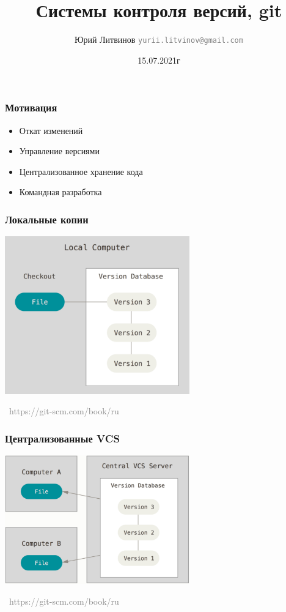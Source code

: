 \documentclass[xetex,mathserif,serif]{beamer}
\title{Системы контроля версий, git}
\author[Юрий Литвинов]{Юрий Литвинов \newline \textcolor{gray}{\small\texttt{yurii.litvinov@gmail.com}}}
\date{15.07.2021г}
\newcommand{\attribution}[1] {
    \vspace{-5mm}\begin{flushright}\begin{scriptsize}\textcolor{gray}{\textcopyright\, #1}\end{scriptsize}\end{flushright}
}
\begin{document}
    
    \frame{\titlepage}
    
    \begin{frame}
        \frametitle{Мотивация}
        \begin{itemize}
            \item Откат изменений
            \item Управление версиями
            \item Централизованное хранение кода
            \item Командная разработка
        \end{itemize}
    \end{frame}

    \begin{frame}
        \frametitle{Локальные копии}
        \begin{center}
            \includegraphics[width=0.6\textwidth]{localCopies.png}
            \attribution{https://git-scm.com/book/ru}
        \end{center}
    \end{frame}

    \begin{frame}
        \frametitle{Централизованные VCS}
        \begin{center}
            \includegraphics[width=0.6\textwidth]{centralizedVcs.png}
            \attribution{https://git-scm.com/book/ru}
        \end{center}
    \end{frame}
\end{document}
